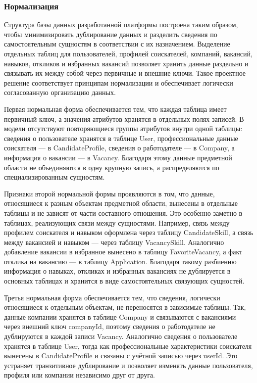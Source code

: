 \subsubsection{Нормализация}

Структура базы данных разработанной платформы построена таким образом, чтобы минимизировать дублирование данных и разделить сведения по самостоятельным сущностям в соответствии с их назначением. Выделение отдельных таблиц для пользователей, профилей соискателей, компаний, вакансий, навыков, откликов и избранных вакансий позволяет хранить данные раздельно и связывать их между собой через первичные и внешние ключи. Такое проектное решение соответствует принципам нормализации и обеспечивает логически согласованную организацию данных.

Первая нормальная форма обеспечивается тем, что каждая таблица имеет первичный ключ, а значения атрибутов хранятся в отдельных полях записей. В модели отсутствуют повторяющиеся группы атрибутов внутри одной таблицы: сведения о пользователе хранятся в таблице User, профессиональные данные соискателя — в CandidateProfile, сведения о работодателе — в Company, а информация о вакансии — в Vacancy. Благодаря этому данные предметной области не объединяются в одну крупную запись, а распределяются по специализированным сущностям.

Признаки второй нормальной формы проявляются в том, что данные, относящиеся к разным объектам предметной области, вынесены в отдельные таблицы и не зависят от части составного отношения. Это особенно заметно в таблицах, реализующих связи между сущностями. Например, связь между профилем соискателя и навыком оформлена через таблицу CandidateSkill, а связь между вакансией и навыком — через таблицу VacancySkill. Аналогично добавление вакансии в избранное вынесено в таблицу FavoriteVacancy, а факт отклика на вакансию — в таблицу Application. Благодаря такому разбиению информация о навыках, откликах и избранных вакансиях не дублируется в основных таблицах и хранится в виде самостоятельных связующих сущностей.

Третья нормальная форма обеспечивается тем, что сведения, логически относящиеся к отдельным объектам, не переносятся в зависимые таблицы. Так, данные компании хранятся в таблице Company и связываются с вакансиями через внешний ключ companyId, поэтому сведения о работодателе не дублируются в каждой записи Vacancy. Аналогично сведения о пользователе хранятся в таблице User, тогда как профессиональные характеристики соискателя вынесены в CandidateProfile и связаны с учётной записью через userId. Это устраняет транзитивное дублирование и позволяет изменять данные пользователя, профиля или компании независимо друг от друга.


